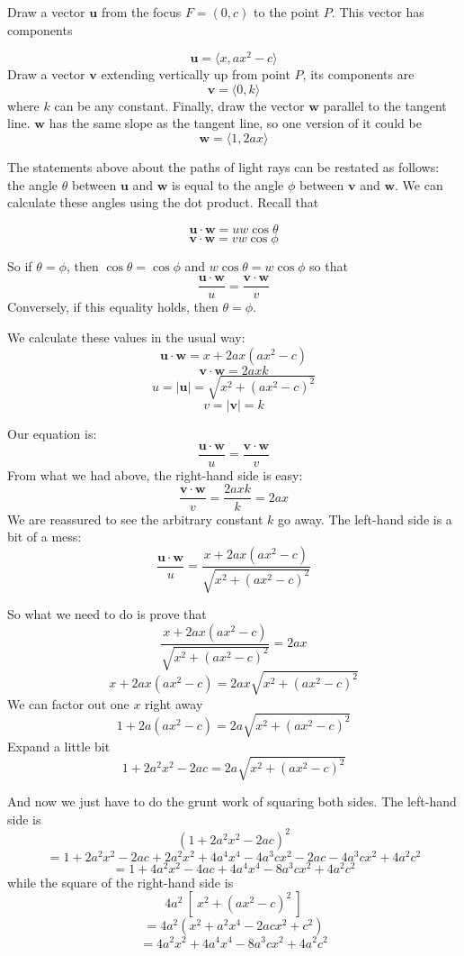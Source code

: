 \documentclass[11pt, oneside]{article}
\begin{document}
Draw a vector $\mathbf{u}$ from the focus $F = (0,c)$ to the point $P$.  This vector has components

\[ \mathbf{u} = \langle x, ax^2 - c \rangle \]
Draw a vector $\mathbf{v}$ extending vertically up from point $P$, its components are
\[ \mathbf{v} = \langle 0, k \rangle \]
where $k$ can be any constant.
Finally, draw the vector $\mathbf{w}$ parallel to the tangent line.  $\mathbf{w}$ has the same slope as the tangent line, so one version of it could be
\[ \mathbf{w} = \langle 1, 2ax \rangle \]

The statements above about the paths of light rays can be restated as follows:  the angle $\theta$ between $\mathbf{u}$ and $\mathbf{w}$ is equal to the angle $\phi$ between $\mathbf{v}$ and $\mathbf{w}$.  We can calculate these angles using the dot product.  Recall that

\[ \mathbf{u} \cdot \mathbf{w} = u w \cos \theta \]
\[ \mathbf{v} \cdot \mathbf{w} = v w \cos \phi \]

So if $\theta = \phi$, then $\cos \theta = \cos \phi$ and $w \cos \theta = w \cos \phi$ so that
\[ \frac{\mathbf{u} \cdot \mathbf{w}}{u} = \frac{\mathbf{v} \cdot \mathbf{w}}{v} \]
Conversely, if this equality holds, then $\theta = \phi$.

We calculate these values in the usual way:
\[ \mathbf{u} \cdot \mathbf{w} = x + 2ax (ax^2 - c) \]
\[ \mathbf{v} \cdot \mathbf{w} = 2ax k \]
\[ u = | \mathbf{u} | = \sqrt{x^2 + (ax^2 - c)^2} \]
\[ v = | \mathbf{v} | = k \]

Our equation is:
\[ \frac{\mathbf{u} \cdot \mathbf{w}}{u} = \frac{\mathbf{v} \cdot \mathbf{w}}{v} \]
From what we had above, the right-hand side is easy:
\[ \frac{\mathbf{v} \cdot \mathbf{w}}{v} = \frac{2axk}{k} = 2ax \]
We are reassured to see the arbitrary constant $k$ go away.  The left-hand side is a bit of a mess:
\[ \frac{\mathbf{u} \cdot \mathbf{w}}{u}  = \frac{x + 2ax (ax^2 - c)}{\sqrt{x^2 + (ax^2 - c)^2} } \]

So what we need to do is prove that
\[ \frac{x + 2ax (ax^2 - c)}{\sqrt{x^2 + (ax^2 - c)^2} } = 2ax \]
\[ x + 2ax (ax^2 - c) = 2ax \sqrt{x^2 + (ax^2 - c)^2} \]
We can factor out one $x$ right away
\[ 1 + 2a (ax^2 - c) = 2a \sqrt{x^2 + (ax^2 - c)^2} \]
Expand a little bit
\[ 1 + 2a^2x^2 - 2ac = 2a \sqrt{x^2 + (ax^2 - c)^2} \]

And now we just have to do the grunt work of squaring both sides.  The left-hand side is
\[ (1 + 2a^2x^2 - 2ac)^2 \]
\[ = 1 + 2a^2x^2 - 2ac + 2a^2x^2 + 4a^4x^4 - 4a^3cx^2 - 2ac - 4a^3cx^2 + 4a^2c^2 \]
\[ = 1 + 4a^2x^2 - 4ac + 4a^4x^4 - 8a^3cx^2 + 4a^2c^2 \]
while the square of the right-hand side is
\[ 4a^2 \ [ \ x^2 + (ax^2 - c)^2 \ ] \]
\[ = 4a^2(x^2 + a^2x^4 - 2acx^2 + c^2) \]
\[ = 4a^2x^2 + 4a^4x^4 - 8a^3cx^2 + 4 a^2c^2 \]
\end{document}
